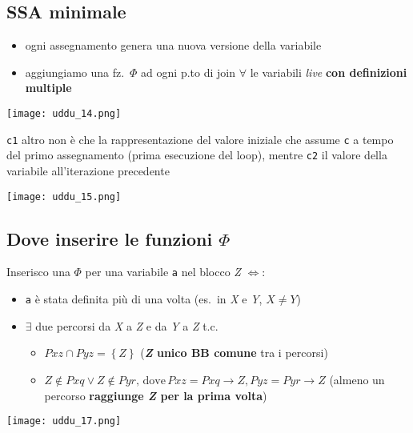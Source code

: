 \subsection{SSA minimale}

\noindent \begin{minipage}[c]{.6\textwidth}
\begin{itemize}
  \item ogni assegnamento genera una nuova versione della variabile
  \item aggiungiamo una fz.~$\Phi$ ad ogni p.to di join $\forall$ le variabili \textit{live} \textbf{con definizioni multiple} 
\end{itemize}
\end{minipage}\hfill
\begin{minipage}[c]{.25\textwidth}
\texttt{[image: uddu\_14.png]}
\end{minipage}

\begin{example}[frametitle={Esempio con loop}]
  \noindent\begin{minipage}[c]{.5\textwidth}
  \lstinline|c1| altro non \`e che la rappresentazione del valore iniziale che assume \lstinline|c| a tempo del primo assegnamento (prima esecuzione del loop), mentre \lstinline|c2| il valore della variabile all'iterazione precedente
  \end{minipage}\hfill
  \begin{minipage}[c]{.45\textwidth}
  \texttt{[image: uddu\_15.png]}
  \end{minipage}
\end{example}

\subsection{Dove inserire le funzioni $\Phi$}

\noindent \begin{minipage}[c]{.7\textwidth}
Inserisco una $\Phi$ per una variabile \lstinline|a| nel blocco \textit{Z} $\iff$:
\begin{itemize}
  \item \lstinline|a| \`e stata definita pi\`u di una volta (es.~in \textit{X} e \textit{Y}, $X\neq Y$)
  \item $\exists$ due percorsi da \textit{X} a \textit{Z} e da \textit{Y} a \textit{Z} t.c.
  \begin{itemize}
    \item $Pxz \cap Pyz = \left\lbrace Z \right\rbrace$ (\textbf{\textit{Z} unico BB comune} tra i percorsi)
    \item $Z \notin Pxq \lor Z \notin Pyr,\, \text{dove}\, Pxz = Pxq \rightarrow Z, Pyz = Pyr \rightarrow Z$ (almeno un percorso \textbf{raggiunge \textit{Z} per la prima volta})
  \end{itemize}
\end{itemize}
\end{minipage}\hfill
\begin{minipage}[c]{.25\textwidth}
\texttt{[image: uddu\_17.png]}
\end{minipage}

